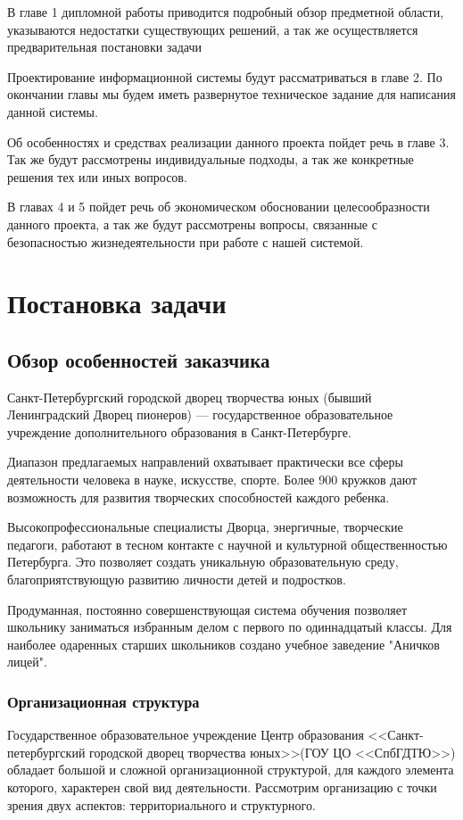 \documentclass[utf8,usehyperref,12pt]{G7-32}
\begin{document}
В главе 1 дипломной работы приводится подробный обзор предметной области, указываются недостатки существующих решений, а так же осуществляется предварительная постановки задачи

Проектирование  информационной системы будут рассматриваться в главе 2. По  окончании главы мы будем иметь развернутое техническое задание для написания данной системы.

Об особенностях и средствах реализации данного проекта пойдет речь в главе 3. Так  же  будут рассмотрены индивидуальные подходы, а так же конкретные решения тех или иных вопросов. 

В главах 4 и 5 пойдет речь об экономическом обосновании целесообразности данного проекта, а так же будут рассмотрены вопросы, связанные с безопасностью жизнедеятельности при работе с нашей системой. 

\mainmatter %

\chapter{Постановка задачи}
\section{Обзор особенностей заказчика}
Санкт-Петербургский городской дворец творчества юных (бывший Ленинградский Дворец пионеров) — государственное образовательное учреждение дополнительного образования в Санкт-Петербурге.

Диапазон предлагаемых направлений охватывает практически все сферы деятельности человека в науке, искусстве, спорте. Более 900 кружков дают возможность для развития творческих способностей каждого ребенка.

Высокопрофессиональные специалисты Дворца, энергичные, творческие педагоги, работают в тесном контакте с научной и культурной общественностью Петербурга. Это позволяет создать уникальную образовательную среду, благоприятствующую развитию личности детей и подростков.

Продуманная, постоянно совершенствующая система обучения позволяет школьнику заниматься избранным делом с первого по одиннадцатый классы. Для наиболее одаренных старших школьников создано учебное заведение "Аничков лицей".

\subsection{Организационная структура}
Государственное образовательное учреждение Центр образования <<Санкт-петербургский городской дворец творчества юных>>(ГОУ ЦО <<СпбГДТЮ>>) обладает большой и сложной организационной структурой, для каждого элемента которого, характерен свой вид деятельности. Рассмотрим организацию с точки зрения двух аспектов: территориального и структурного.
\end{document}
